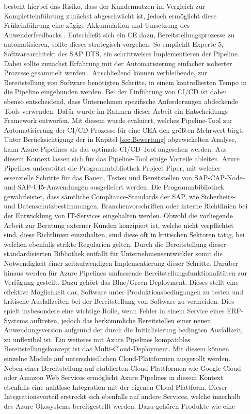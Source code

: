 besteht hierbei das Risiko, dass der Kundennutzen im Vergleich zur Kompletteinführung zunächst abgeschwächt ist, jedoch ermöglicht diese Früheinführung eine zügige Akkumulation und Umsetzung des Anwenderfeedbacks \cite[9]{Halstenberg.2020}. 
Entschließt sich ein CE dazu, Bereitstellungsprozesse zu automatisieren, sollte dieses strategisch vorgehen. So empfiehlt Experte 5, Softwarearchitekt des SAP DTS, ein schrittweises Implementieren der Pipeline. Dabei sollte zunächst Erfahrung mit der Automatisierung einfacher isolierter Prozesse gesammelt werden \cite[Z. 8 ff.]{SoftwareArchitektSAPDTSIntegration.}. Anschließend können verbleibende, zur Bereitstellung von Software benötigten Schritte, in einem kontrollierten Tempo in die Pipeline eingebunden werden. Bei der Einführung von CI/CD ist dabei ebenso entscheidend, dass Unternehmen spezifische Anforderungen abdeckende Tools verwenden. Dafür wurde im Rahmen dieser Arbeit ein Entscheidungs-Framework entworfen. Mit diesem wurde evaluiert, welches Pipeline-Tool zur Automatisierung der CI/CD-Prozesse für eine CEA den größten Mehrwert birgt. Unter Berücksichtigung der in Kapitel \ref{sec:Bewertung} abgewickelten Analyse, kann Azure Pipelines als das optimale CI/CD-Tool angesehen werden. Aus diesem Kontext lassen sich für das Pipeline-Tool einige Vorteile ableiten. Azure Pipelines unterstützt die Programmbibliothek Project Piper, mit welcher essenzielle Schritte für das Bauen, Testen und Bereitstellen von SAP-CAP-Node- und SAP-UI5-Anwendungen ausgeliefert werden. Die Programmbibliothek gewährleistet, dass sämtliche Compliance-Standards der SAP, wie Sicherheits- und Datenschutzbestimmungen, Branchenvorschriften oder interne Richtlinien bei der Entwicklung von IT-Services eingehalten werden. Obwohl die vorliegende Arbeit zur Beratung externer Kunden konzipiert ist, welche nicht verpflichtet sind, diese Richtlinien einzuhalten, sind diese oft in kritischen Sektoren tätig, bei welchen ebenfalls strikte Regularien gelten. Durch die Bereitstellung dieser standardisierten Bibliothek entfällt für Unternehmensentwickler somit die Notwendigkeit einer zeitaufwendigen Implementierung dieser Schritte. Darüber hinaus werden für Azure Pipelines umfassende Bereitstellungsfunktionalitäten zur Verfügung gestellt. Dazu gehört das Blue/Green-Deployment. Dieses stellt eine effektive Möglichkeit dar, Software unter Produktionsbedingungen zu testen und kritische Ausfallzeiten bei der Bereitstellung von Software zu vermeiden. Dies spielt insbesondere eine wichtige Rolle, wenn Fehler in einem Service eines ERP-Systems auftreten, jedoch das herkömmliche Bereitstellen einer neuen Anwendungsversion aufgrund der durch die Initialisierung  bedingten Ausfallzeit, zu unflexibel ist. Ein weiteres mit Azure Pipelines kompatibles Bereitstellungskonzept ist das Multi-Cloud-Deployment. Mit diesem können einzelne Module auf unterschiedlichen Cloud-Plattformen ausgerollt werden. Neben einer Bereitstellung auf etablierten Cloud-Plattformen wie Google Cloud oder Amazon Web Services ermöglicht Azure Pipelines in diesem Kontext ebenfalls eine nahtlose Integration mit der eigenen Cloud-Plattform. Dieser Integrationsvorteil erstreckt sich ebenfalls auf andere Services, welche innerhalb des Azure-Ökosystems bereitgestellt werden. Dazu gehören Produkte wie eine 